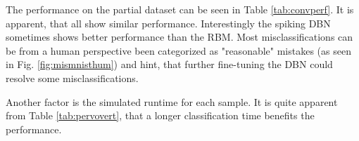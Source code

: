 %

The performance on the partial dataset can be seen in Table \ref{tab:convperf}.
It is apparent, that all show similar performance. Interestingly the spiking DBN sometimes shows better performance than the RBM.
Most misclassifications can be from a human perspective been categorized as "reasonable" mistakes (as seen in Fig. \ref{fig:mismnisthum}) and hint, that further fine-tuning the DBN could resolve some misclassifications.

Another factor is the simulated runtime for each sample. It is quite apparent from Table \ref{tab:pervovert}, that a longer classification time benefits the performance.


